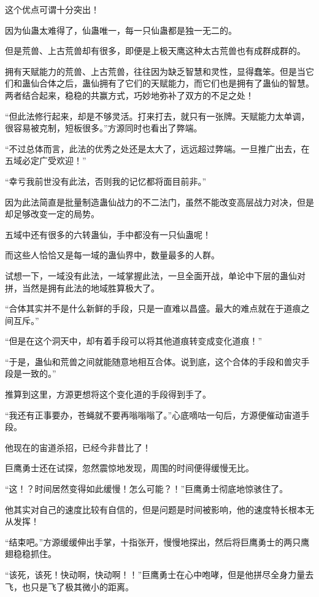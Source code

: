 \begin{this_body}
这个优点可谓十分突出！

因为仙蛊太难得了，仙蛊唯一，每一只仙蛊都是独一无二的。

但是荒兽、上古荒兽却有很多，即便是上极天鹰这种太古荒兽也有成群成群的。

拥有天赋能力的荒兽、上古荒兽，往往因为缺乏智慧和灵性，显得蠢笨。但是当它们和蛊仙合体之后，蛊仙拥有了它们的天赋能力，而它们也是拥有了蛊仙的智慧。两者结合起来，稳稳的共赢方式，巧妙地弥补了双方的不足之处！

“但此法修行起来，却是不够灵活。打来打去，就只有一张牌。天赋能力太单调，很容易被克制，短板很多。”方源同时也看出了弊端。

“不过总体而言，此法的优秀之处还是太大了，远远超过弊端。一旦推广出去，在五域必定广受欢迎！”

“幸亏我前世没有此法，否则我的记忆都将面目前非。”

因为此法简直是批量制造蛊仙战力的不二法门，虽然不能改变高层战力对决，但是却足够改变一定的局势。

五域中还有很多的六转蛊仙，手中都没有一只仙蛊呢！

而这些人恰恰又是每一域的蛊仙界中，数量最多的人群。

试想一下，一域没有此法，一域掌握此法，一旦全面开战，单论中下层的蛊仙对拼，当然是拥有此法的地域胜算极大了。

“合体其实并不是什么新鲜的手段，只是一直难以昌盛。最大的难点就在于道痕之间互斥。”

“但是在这个洞天中，却有着手段可以将其他道痕转变成变化道痕！”

“于是，蛊仙和荒兽之间就能随意地相互合体。说到底，这个合体的手段和兽灾手段是一致的。”

推算到这里，方源更想将这个变化道的手段得到手了。

“我还有正事要办，苍蝇就不要再嗡嗡嗡了。”心底嘀咕一句后，方源便催动宙道手段。

他现在的宙道杀招，已经今非昔比了！

巨鹰勇士还在试探，忽然震惊地发现，周围的时间便得缓慢无比。

“这！？时间居然变得如此缓慢！怎么可能？！”巨鹰勇士彻底地惊骇住了。

他其实对自己的速度比较有自信的，但是问题是时间被影响，他的速度特长根本无从发挥！

“结束吧。”方源缓缓伸出手掌，十指张开，慢慢地探出，然后将巨鹰勇士的两只鹰翅稳稳抓住。

“该死，该死！快动啊，快动啊！！”巨鹰勇士在心中咆哮，但是他拼尽全身力量去飞，也只是飞了极其微小的距离。


\end{this_body}
